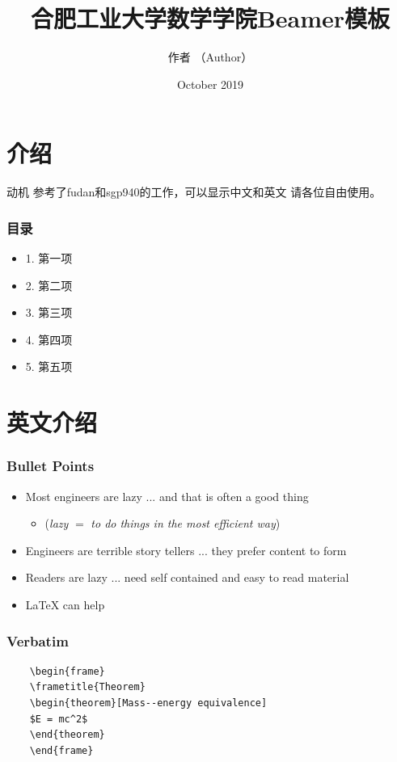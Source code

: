 \documentclass{beamer}
\title{合肥工业大学数学学院Beamer模板}
\author{作者  （Author）}
\institute{School of Mathematics, HFUT}
\date{October 2019}
\begin{document}
  
  \begin{frame}
    \maketitle
  \end{frame}

\section{介绍}

\begin{frame}{动机}
参考了fudan和sgp940的工作，可以显示中文和英文
请各位自由使用。
\end{frame}


\begin{frame}
\frametitle{目录}
\begin{itemize}
\item 1. 第一项
\item 2. 第二项
\item 3. 第三项
\item 4. 第四项
\item 5. 第五项
\end{itemize}
\end{frame}


\section{英文介绍}
\begin{frame}
\frametitle{Bullet Points}
\vspace{-0.3cm}
\begin{itemize}
	\item Most engineers are lazy ... and that is often a good thing
	\begin{itemize}
		\item (\textit{lazy} $=$ \textit{to do things in the most efficient way})
	\end{itemize}
	\item Engineers are terrible story tellers ... they prefer content to form
	\item Readers are lazy ... need self contained and easy to read material
	\item \LaTeX{} can help
\end{itemize}
\end{frame}

\begin{frame}[fragile] %
\frametitle{Verbatim}
\begin{example}
	\begin{verbatim}
	\begin{frame}
	\frametitle{Theorem}
	\begin{theorem}[Mass--energy equivalence]
	$E = mc^2$
	\end{theorem}
	\end{frame}\end{verbatim}
\end{example}
\end{frame}
\end{document}
